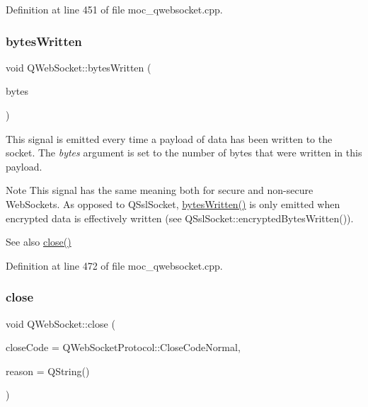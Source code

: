 Definition at line 451 of file moc\+\_\+qwebsocket.\+cpp.

\mbox{\label{class_q_web_socket_ad4be1036cba153baa4a7a7c2bfa3fe91}} 
\subsubsection{\texorpdfstring{bytes\+Written}{bytesWritten}}
{\footnotesize\ttfamily void Q\+Web\+Socket\+::bytes\+Written (\begin{DoxyParamCaption}\item[{qint64}]{bytes }\end{DoxyParamCaption})\hspace{0.3cm}{\ttfamily [signal]}}

This signal is emitted every time a payload of data has been written to the socket. The {\itshape bytes} argument is set to the number of bytes that were written in this payload.

\begin{DoxyNote}{Note}
This signal has the same meaning both for secure and non-\/secure Web\+Sockets. As opposed to Q\+Ssl\+Socket, \mbox{\hyperlink{class_q_web_socket_ad4be1036cba153baa4a7a7c2bfa3fe91}{bytes\+Written()}} is only emitted when encrypted data is effectively written (see Q\+Ssl\+Socket\+::encrypted\+Bytes\+Written()). 
\end{DoxyNote}
\begin{DoxySeeAlso}{See also}
\mbox{\hyperlink{class_q_web_socket_ae1c9af16e7f53666ccd423864b8e2c35}{close()}} 
\end{DoxySeeAlso}


Definition at line 472 of file moc\+\_\+qwebsocket.\+cpp.

\mbox{\label{class_q_web_socket_ae1c9af16e7f53666ccd423864b8e2c35}} 
\subsubsection{\texorpdfstring{close}{close}}
{\footnotesize\ttfamily void Q\+Web\+Socket\+::close (\begin{DoxyParamCaption}\item[{\mbox{\hyperlink{namespace_q_web_socket_protocol_a9f236676f594451d8d723f260b71028c}{Q\+Web\+Socket\+Protocol\+::\+Close\+Code}}}]{close\+Code = {\ttfamily QWebSocketProtocol\+:\+:CloseCodeNormal},  }\item[{const Q\+String \&}]{reason = {\ttfamily QString()} }\end{DoxyParamCaption})\hspace{0.3cm}{\ttfamily [slot]}}



